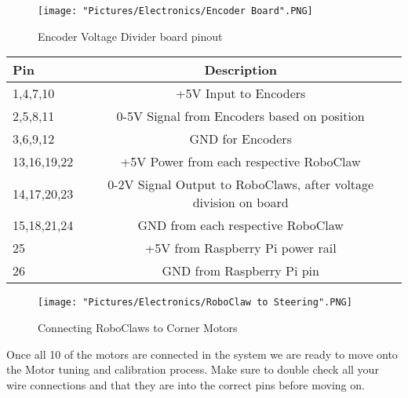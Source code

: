 \documentclass[12pt]{article}
\begin{document}
\begin{figure}[H]
 	\centering
	\texttt{[image: "Pictures/Electronics/Encoder Board".PNG]}
 	\caption{Encoder Voltage Divider board pinout}
	\label{vd pinout}
\end{figure}

\begin{tabular}[2] {| l | c |}
	\hline
	\textbf{Pin} & \textbf{Description} \\ \hline
	1,4,7,10 & +5V Input to Encoders \\ \hline
	2,5,8,11 & 0-5V Signal from Encoders based on position \\ \hline
	3,6,9,12 & GND for Encoders \\ \hline \hline
	13,16,19,22 & +5V Power from each respective RoboClaw \\ \hline
	14,17,20,23 & 0-2V Signal Output to RoboClaws, after voltage division on board \\ \hline
	15,18,21,24 & GND from each respective RoboClaw \\ \hline \hline
	25 & +5V from Raspberry Pi power rail \\ \hline
	26 & GND from Raspberry Pi pin \\ \hline
\end{tabular}

\begin{figure}[H]
 	\centering
	\texttt{[image: "Pictures/Electronics/RoboClaw to Steering".PNG]}
 	\caption{Connecting RoboClaws to Corner Motors}
	\label{RC to Steering}
\end{figure}

Once all 10 of the motors are connected in the system we are ready to move onto the Motor tuning and calibration process. Make sure to double check all your wire connections and that they are into the correct pins before moving on. 
\end{document}
